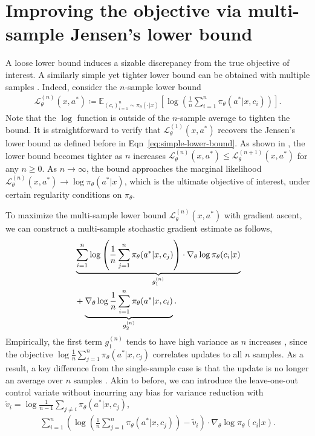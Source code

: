 \documentclass{article}
\theoremstyle{definition}
\begin{document}
\section{Improving the objective via multi-sample Jensen's lower bound}\label{sec:algo-multi}

A loose lower bound induces a sizable discrepancy from the true objective of interest. A similarly simple yet tighter lower bound can be obtained with multiple samples \citep{burda2015importance}. Indeed, consider the $n$-sample lower bound
\begin{align}
\mathcal{L}_\theta^{(n)}(x,a^\ast)\coloneqq \mathbb{E}_{(c_i)_{i=1}^n\sim \pi_\theta(\cdot|x)} \! \left[  \log  \! \left(  \!
\frac{1}{n}\sum_{i=1}^n \pi_\theta(a^\ast|x,c_i) \! \right) \! \right] \! . \label{eq:simple-lower-bound-n}
\end{align}
Note that the $\log$ function is outside of the $n$-sample average to tighten the bound.
It is straightforward to verify that $\mathcal{L}_\theta^{(1)}(x,a^\ast)$ recovers the Jensen's lower bound as defined before in Eqn~\eqref{eq:simple-lower-bound}. As shown in \citet{burda2015importance}, the lower bound becomes tighter as $n$ increases $
   \mathcal{L}_\theta^{(n)}(x,a^\ast) \leq \mathcal{L}_\theta^{(n+1)}(x,a^\ast)$ for any $n\geq 0$. As $n\rightarrow\infty$, the bound approaches the marginal likelihood $\mathcal{L}_\theta^{(n)}(x,a^\ast)\rightarrow \log \pi_\theta(a^\ast|x)$, which is the ultimate objective of interest, under certain regularity conditions on $\pi_\theta$. 

To maximize the multi-sample lower bound $\mathcal{L}_\theta^{(n)}(x,a^*)$ with gradient ascent, we can construct a multi-sample stochastic gradient estimate as follows, 
\begin{align}
    &\underbrace{\sum_{i=1}^n \log \left(\frac{1}{n}\sum_{j=1}^n \pi_\theta(a^\ast|x,c_j)\right) \cdot \nabla_\theta \log \pi_\theta(c_i|x)}_{g_1^{(n)}} \notag \\
    &+ 
     \underbrace{\nabla_\theta  \log \frac{1}{n}\sum_{i=1}^n  \pi_\theta(a^\ast|x,c_i)}_{g_2^{(n)}}. \label{eq:multisample-gradient}
\end{align}
Empirically, the first term $g_1^{(n)}$ tends to have high variance as $n$ increases \citep{rainforth2018tighter}, since the objective $\log \frac{1}{n}\sum_{j=1}^n \pi_\theta(a^\ast|x,c_j)$ correlates updates to all $n$ samples. As a result, a key difference from the single-sample case is that the update is no longer an average over $n$ samples \citep{tang2025optimizing}. Akin to before, we can introduce the leave-one-out control variate without incurring any bias for variance reduction \citep{mnih2016variational,kool2019buy} with $\tilde{v}_i =\log \frac{1}{n-1}\sum_{j \neq i} \pi_\theta(a^\ast|x,c_j)$,
\begin{align*}
    \sum_{i=1}^n \left(\log \left(\frac{1}{n}\sum_{j=1}^n \pi_\theta(a^\ast|x,c_j)\right) - \tilde{v}_i\right) \cdot \nabla_\theta \log \pi_\theta(c_i|x).
\end{align*}
\end{document}
